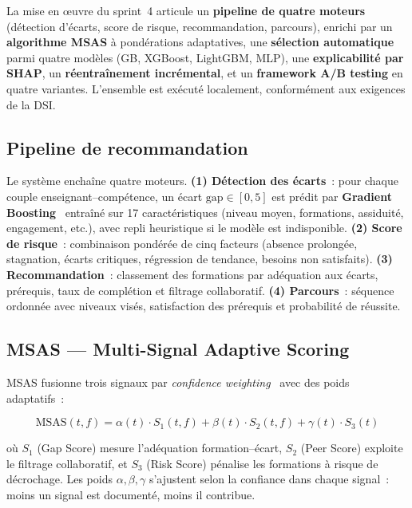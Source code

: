 \documentclass[12pt,a4paper]{report}
\begin{document}
\begin{summaryframe}[frametitle={En bref — Réalisation du sprint~4}]
La mise en œuvre du sprint~4 articule un \textbf{pipeline de quatre moteurs}
(détection d'écarts, score de risque, recommandation, parcours), enrichi par un
\textbf{algorithme MSAS} à pondérations adaptatives, une \textbf{sélection
automatique} parmi quatre modèles (GB, XGBoost, LightGBM, MLP), une
\textbf{explicabilité par SHAP}, un \textbf{réentraînement incrémental}, et un
\textbf{framework A/B testing} en quatre variantes. L'ensemble est exécuté
localement, conformément aux exigences de la DSI.
\end{summaryframe}

\subsection*{Pipeline de recommandation}

Le système enchaîne quatre moteurs. \textbf{(1) Détection des écarts}~: pour
chaque couple enseignant--compétence, un écart \(\text{gap} \in [0,5]\) est prédit
par \textbf{Gradient Boosting}~\cite{friedman2001gbm} entraîné sur 17
caractéristiques (niveau moyen, formations, assiduité, engagement, etc.), avec
repli heuristique si le modèle est indisponible. \textbf{(2) Score de risque}~:
combinaison pondérée de cinq facteurs (absence prolongée, stagnation, écarts
critiques, régression de tendance, besoins non satisfaits). \textbf{(3)
Recommandation}~: classement des formations par adéquation aux écarts, prérequis,
taux de complétion et filtrage collaboratif. \textbf{(4) Parcours}~: séquence
ordonnée avec niveaux visés, satisfaction des prérequis et probabilité de réussite.

\subsection*{MSAS --- Multi-Signal Adaptive Scoring}

MSAS fusionne trois signaux par \emph{confidence weighting}~\cite{ting1999instance}
avec des poids adaptatifs~:

\[
\text{MSAS}(t, f) = \alpha(t) \cdot S_1(t,f) + \beta(t) \cdot S_2(t,f) + \gamma(t) \cdot S_3(t)
\]

où \(S_1\) (Gap Score) mesure l'adéquation formation--écart, \(S_2\) (Peer Score)
exploite le filtrage collaboratif, et \(S_3\) (Risk Score) pénalise les formations
à risque de décrochage. Les poids \(\alpha,\beta,\gamma\) s'ajustent selon la
confiance dans chaque signal~: moins un signal est documenté, moins il contribue.
\end{document}
